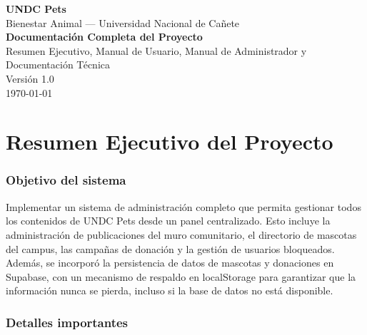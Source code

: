 \documentclass[12pt,a4paper]{article}
\begin{document}
\begin{titlepage}
    \centering
    \vspace*{3cm}
    {\Huge\bfseries UNDC Pets}\\[0.5cm]
    {\Large Bienestar Animal --- Universidad Nacional de Cañete}\\[1.5cm]
    {\LARGE\bfseries Documentación Completa del Proyecto}\\[0.8cm]
    {\large Resumen Ejecutivo, Manual de Usuario, Manual de Administrador y Documentación Técnica}\\[3cm]
    \vfill
    {\large Versión 1.0}\\
    {\large \today}
\end{titlepage}

\tableofcontents
\newpage

\part{Resumen Ejecutivo del Proyecto}

\section{Objetivo del sistema}

Implementar un sistema de administración completo que permita gestionar todos los contenidos de UNDC Pets desde un panel centralizado. Esto incluye la administración de publicaciones del muro comunitario, el directorio de mascotas del campus, las campañas de donación y la gestión de usuarios bloqueados. Además, se incorporó la persistencia de datos de mascotas y donaciones en Supabase, con un mecanismo de respaldo en localStorage para garantizar que la información nunca se pierda, incluso si la base de datos no está disponible.

\section{Detalles importantes}
\end{document}
